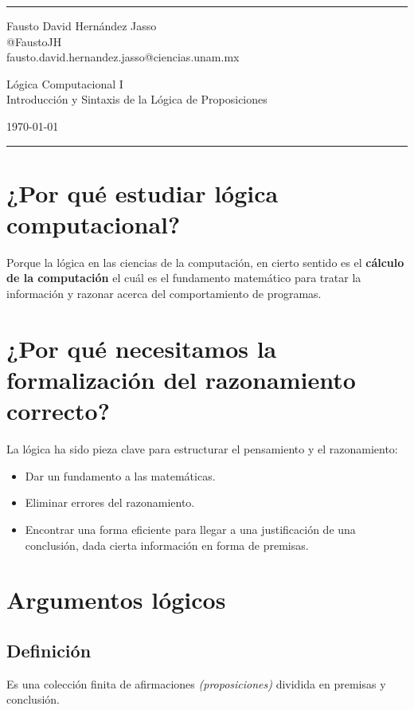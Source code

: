 \documentclass[a4paper]{article}
\begin{document}

\fancyhead[C]{}
\hrule \medskip %
\begin{minipage}{0.295\textwidth} 
\raggedright
\footnotesize
Fausto David Hernández Jasso \hfill\\   
@FaustoJH \hfill\\
fausto.david.hernandez.jasso@ciencias.unam.mx
\end{minipage}
\begin{minipage}{0.4\textwidth} 
\centering 
\large 
Lógica Computacional I\\ 
\normalsize 
Introducción y Sintaxis de la Lógica de Proposiciones\\ 
\end{minipage}
\begin{minipage}{0.295\textwidth} 
\raggedleft
\today\hfill\\
\end{minipage}
\medskip\hrule 
\bigskip
\section{¿Por qué estudiar lógica computacional?}
\noindent
Porque la lógica en las ciencias de la computación, en cierto sentido es el \textbf{cálculo de la computación}
el cuál es el fundamento matemático para tratar la información y razonar acerca del comportamiento de programas.
\section{¿Por qué necesitamos la formalización del razonamiento correcto?}
\noindent
La lógica ha sido pieza clave para estructurar el pensamiento y el razonamiento:
\begin{itemize}
    \item Dar un fundamento a las matemáticas.
    \item Eliminar errores del razonamiento.
    \item Encontrar una forma eficiente para llegar a una justificación de una conclusión, dada cierta información en 
    forma de premisas.
\end{itemize}
\section{Argumentos lógicos}
\subsection{Definición}
\noindent
Es una colección finita de afirmaciones \textit{(proposiciones)} dividida en premisas y conclusión.
\end{document}
